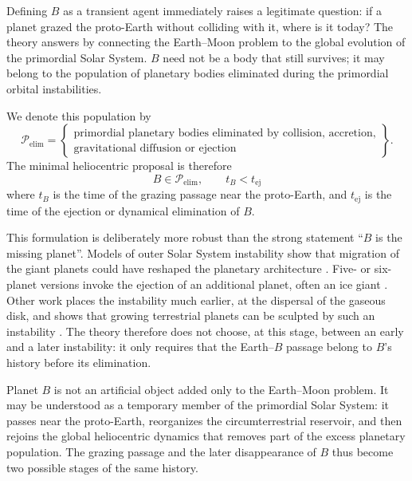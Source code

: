 \documentclass[11pt,a4paper,openany]{report}
\begin{document}
Defining $B$ as a transient agent immediately raises a legitimate question: if a planet grazed the
proto-Earth without colliding with it, where is it today? The theory answers by connecting the
Earth--Moon problem to the global evolution of the primordial Solar System. $B$ need not be a body
that still survives; it may belong to the population of planetary bodies eliminated during the
primordial orbital instabilities.

We denote this population by
\begin{equation}
\mathcal{P}_{\mathrm{elim}}=
\left\{\begin{array}{l}
\text{primordial planetary bodies eliminated by collision, accretion,}\\
\text{gravitational diffusion or ejection}
\end{array}\right\}.
\label{eq:Pelim}
\end{equation}
The minimal heliocentric proposal is therefore
\begin{equation}
\boxed{\;B\in\mathcal{P}_{\mathrm{elim}},\qquad t_B<t_{\mathrm{ej}}\;}
\label{eq:tB-tej}
\end{equation}
where $t_B$ is the time of the grazing passage near the proto-Earth, and $t_{\mathrm{ej}}$ is the time
of the ejection or dynamical elimination of $B$.

This formulation is deliberately more robust than the strong statement ``$B$ is the missing
planet''. Models of outer Solar System instability show that migration of the giant planets could
have reshaped the planetary architecture \cite{Tsiganis2005,Gomes2005}. Five- or six-planet
versions invoke the ejection of an additional planet, often an ice giant
\cite{Nesvorny2011,NesvornyMorbidelli2012}. Other work places the instability much earlier, at the
dispersal of the gaseous disk, and shows that growing terrestrial planets can be sculpted by such
an instability \cite{Liu2022,Clement2018}. The theory therefore does not choose, at this stage,
between an early and a later instability: it only requires that the Earth--$B$ passage belong to
$B$'s history before its elimination.

\begin{ideephys}
Planet $B$ is not an artificial object added only to the Earth--Moon problem. It may be understood
as a temporary member of the primordial Solar System: it passes near the proto-Earth, reorganizes
the circumterrestrial reservoir, and then rejoins the global heliocentric dynamics that removes
part of the excess planetary population. The grazing passage and the later disappearance of $B$
thus become two possible stages of the same history.
\end{ideephys}
\end{document}

